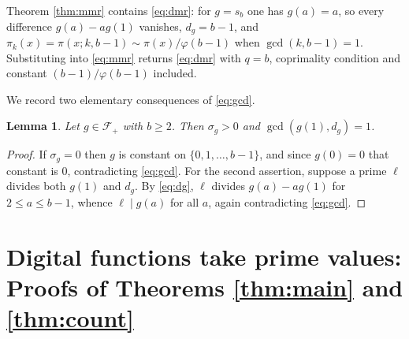\documentclass[11pt,reqno]{amsart}
\theoremstyle{plain}
\newtheorem{lemma}[theorem]{Lemma}
\theoremstyle{definition}
\begin{document}
Theorem \ref{thm:mmr} contains \eqref{eq:dmr}: for $g=s_b$ one has $g(a)=a$, so every difference $g(a)-ag(1)$ vanishes, $d_g=b-1$, and $\pi_k(x)=\pi(x;k,b-1)\sim\pi(x)/\varphi(b-1)$ when $\gcd(k,b-1)=1$. Substituting into \eqref{eq:mmr} returns \eqref{eq:dmr} with $q=b$, coprimality condition and constant $(b-1)/\varphi(b-1)$ included.

We record two elementary consequences of \eqref{eq:gcd}.

\begin{lemma}\label{lem:easy}
Let $g\in\mathcal F_+$ with $b\ge2$. Then $\sigma_g>0$ and $\gcd(g(1),d_g)=1$.
\end{lemma}

\begin{proof}
If $\sigma_g=0$ then $g$ is constant on $\{0,1,\dots,b-1\}$, and since $g(0)=0$ that constant is $0$, contradicting \eqref{eq:gcd}. For the second assertion, suppose a prime $\ell$ divides both $g(1)$ and $d_g$. By \eqref{eq:dg}, $\ell$ divides $g(a)-ag(1)$ for $2\le a\le b-1$, whence $\ell\mid g(a)$ for all $a$, again contradicting \eqref{eq:gcd}.
\end{proof}

\section{Digital functions take prime values: Proofs of Theorems \ref{thm:main} and \ref{thm:count}}
\end{document}
